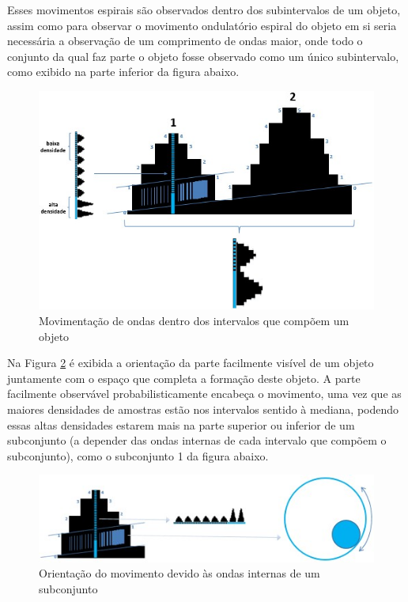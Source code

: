 Esses movimentos espirais são observados dentro dos subintervalos de um objeto, assim como para observar o movimento ondulatório espiral do objeto em si seria necessária a observação de um comprimento de ondas maior, onde todo o conjunto da qual faz parte o objeto fosse observado como um único subintervalo, como exibido na parte inferior da figura abaixo.

	\begin{figure}[H]
	\caption{Movimentação de ondas dentro dos intervalos que compõem um objeto}
	\label{fig:consciousness_space_spiral_undulation}
	\centering
	\includegraphics[scale=.65]{sections/images/consciousness_space_spiral_undulation.jpg}
	\end{figure}

Na Figura \ref{fig:consciousness_space_spiral_direction} é exibida a orientação da parte facilmente visível de um objeto juntamente com o espaço que completa a formação deste objeto. A parte facilmente observável probabilisticamente encabeça o movimento, uma vez que as maiores densidades de amostras estão nos intervalos sentido à mediana, podendo essas altas densidades estarem mais na parte superior ou inferior de um subconjunto (a depender das ondas internas de cada intervalo que compõem o subconjunto), como o subconjunto 1 da figura abaixo.
	\begin{figure}[H]
	\caption{Orientação do movimento devido às ondas internas de um subconjunto}
	\label{fig:consciousness_space_spiral_direction}
	\centering
	\includegraphics[scale=1]{sections/images/consciousness_space_spiral_direction.jpg}
	\end{figure}

